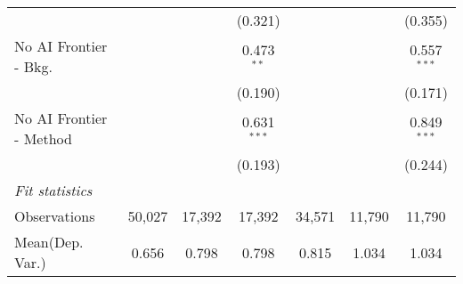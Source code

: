\begin{tabular}{lcccccc}
                           &               &             & (0.321)       &             &         & (0.355)\\   
   No AI Frontier - Bkg.   &               &             & 0.473$^{**}$  &             &         & 0.557$^{***}$\\   
                           &               &             & (0.190)       &             &         & (0.171)\\   
   No AI Frontier - Method &               &             & 0.631$^{***}$ &             &         & 0.849$^{***}$\\   
                           &               &             & (0.193)       &             &         & (0.244)\\   
   \midrule
   \emph{Fit statistics}\\
   Observations            & 50,027        & 17,392      & 17,392        & 34,571      & 11,790  & 11,790\\  
Mean(Dep. Var.) & 0.656 & 0.798 & 0.798 & 0.815 & 1.034 & 1.034 \\
   

\end{tabular}
